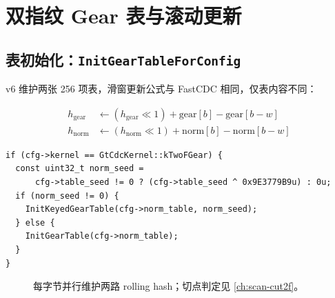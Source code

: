 \chapter{双指纹 Gear 表与滚动更新}
\label{ch:dual-fingerprint}

\section{表初始化：\texttt{InitGearTableForConfig}}

v6 维护两张 256 项表，滑窗更新公式与 FastCDC 相同，仅表内容不同：

\begin{align}
  h_{\mathrm{gear}} &\leftarrow (h_{\mathrm{gear}} \ll 1) + \mathrm{gear}[b] - \mathrm{gear}[b-w] \\
  h_{\mathrm{norm}} &\leftarrow (h_{\mathrm{norm}} \ll 1) + \mathrm{norm}[b] - \mathrm{norm}[b-w]
\end{align}

\begin{lstlisting}[caption={v6 norm 表种子（\filepath{gt\_cdc.cc}）},label={lst:init-norm-table}]
if (cfg->kernel == GtCdcKernel::kTwoFGear) {
  const uint32_t norm_seed =
      cfg->table_seed != 0 ? (cfg->table_seed ^ 0x9E3779B9u) : 0u;
  if (norm_seed != 0) {
    InitKeyedGearTable(cfg->norm_table, norm_seed);
  } else {
    InitGearTable(cfg->norm_table);
  }
}
\end{lstlisting}

\begin{figure}[htbp]
\centering
{}
\caption{每字节并行维护两路 rolling hash；切点判定见 \cref{ch:scan-cut2f}。}
\label{fig:dual-roll}
\end{figure}

